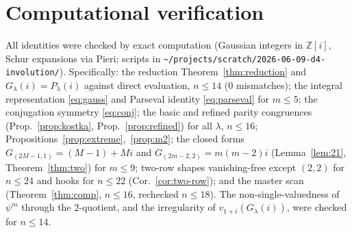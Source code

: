 \documentclass[11pt]{article}
\theoremstyle{definition}
\theoremstyle{remark}
\newcommand{\ZZ}{\mathbb{Z}}
\newcommand{\la}{\lambda}
\begin{document}
\section{Computational verification}
All identities were checked by exact computation (Gaussian integers in $\ZZ[i]$,
Schur expansions via Pieri; scripts in
\texttt{\~{}/projects/scratch/2026-06-09-d4-involution/}). Specifically: the
reduction Theorem~\ref{thm:reduction} and $G_\la(i)=P_\la(i)$ against direct
evaluation, $n\le14$ ($0$ mismatches); the integral representation \eqref{eq:gauss}
and Parseval identity \eqref{eq:parseval} for $m\le5$; the conjugation symmetry
\eqref{eq:conj}; the basic and refined parity congruences
(Prop.~\ref{prop:kostka}, Prop.~\ref{prop:refined}) for all $\la$, $n\le16$;
Propositions~\ref{prop:extreme},~\ref{prop:m2}; the closed forms
$G_{(2M-1,1)}=(M-1)+Mi$ and $G_{(2m-2,2)}=m(m-2)i$ (Lemma~\ref{lem:21},
Theorem~\ref{thm:two}) for $m\le9$; two-row shapes vanishing-free except $(2,2)$ for
$n\le24$ and hooks for $n\le22$ (Cor.~\ref{cor:two-row}); and the master scan
(Theorem~\ref{thm:comp}, $n\le16$, rechecked $n\le18$). The non-single-valuedness of
$\psi^m$ through the $2$-quotient, and the irregularity of $v_{1+i}(G_\la(i))$, were
checked for $n\le14$.
\end{document}
